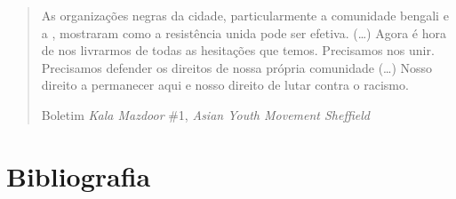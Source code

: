 \begin{quote}
As organizações negras da cidade, particularmente a comunidade bengali e a , mostraram como a resistência unida pode ser efetiva. (\ldots{}) Agora é hora de nos livrarmos de todas as hesitações que temos. Precisamos nos unir. Precisamos defender os direitos de nossa própria comunidade (\ldots{}) Nosso direito a permanecer aqui e nosso direito de lutar contra o racismo.

Boletim \emph{Kala Mazdoor} \#1, \emph{Asian Youth Movement Sheffield}
\end{quote}



\section{Bibliografia}

